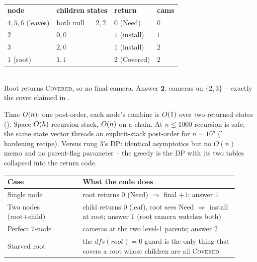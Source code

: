 \begin{tracebox}[On $R$, states \texttt{0=Need,1=Has,2=Covered}]
\begin{tabular}[t]{@{}llll@{}}
\textbf{node} & \textbf{children states} & \textbf{return} & \textbf{cams} \\
$4,5,6$ (leaves) & both null $=2,2$ & $0$ (Need) & $0$ \\
$2$ & $0,0$ & $1$ (install) & $1$ \\
$3$ & $2,0$ & $1$ (install) & $2$ \\
$1$ (root) & $1,1$ & $2$ (Covered) & $2$ \\
\end{tabular}\\
Root returns \textsc{Covered}, so no final camera. Answer $\mathbf{2}$, cameras on
$\{2,3\}$ -- exactly the cover claimed in .
\end{tracebox}

\begin{complexitybox}
Time $O(n)$: one post-order, each node's combine is $O(1)$ over two returned
states (). Space $O(h)$ recursion stack, $O(n)$ on a
chain. At $n\le1000$ recursion is safe; the same state vector threads an
explicit-stack post-order for $n\sim10^{5}$ (' hardening recipe).
Versus rung 3's DP: identical asymptotics but no $O(n)$ memo and no parent-flag
parameter -- the greedy is the DP with its two tables collapsed into the return code.
\end{complexitybox}

\begin{center}\renewcommand{\arraystretch}{1.2}
\begin{tabular}{@{}p{0.30\linewidth} p{0.62\linewidth}@{}}
\toprule
\textbf{Case} & \textbf{What the code does} \\
\midrule
Single node & root returns $0$ (Need) $\Rightarrow$ final $+1$; answer $1$ \\
Two nodes (root+child) & child returns $0$ (leaf), root sees Need $\Rightarrow$ install at
  root; answer $1$ (root camera watches both) \\
Perfect 7-node & cameras at the two level-1 parents; answer $2$ \\
Starved root & the $\mathit{dfs}(\mathit{root}){=}0$ guard is the only thing that
  covers a root whose children are all \textsc{Covered} \\
\bottomrule
\end{tabular}\end{center}

